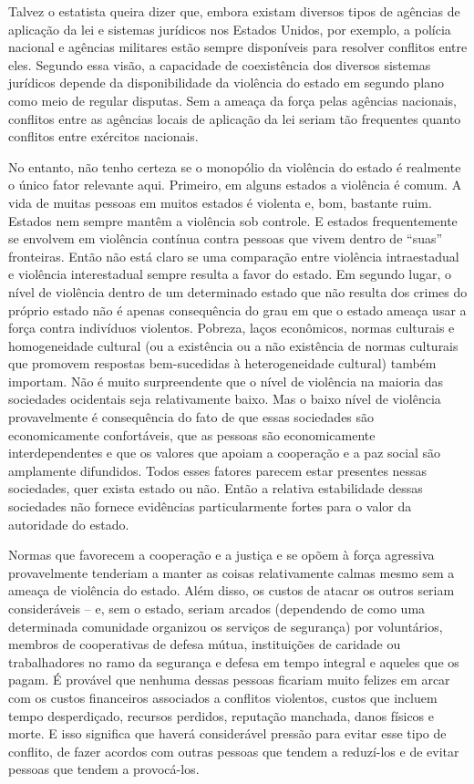 Talvez o estatista queira dizer que, embora existam diversos tipos de agências de aplicação da lei e sistemas jurídicos nos Estados Unidos, por exemplo, a polícia nacional e agências militares estão sempre disponíveis para resolver conflitos entre eles. Segundo essa visão, a capacidade de coexistência dos diversos sistemas jurídicos depende da disponibilidade da violência do estado em segundo plano como meio de regular disputas. Sem a ameaça da força pelas agências nacionais, conflitos entre as agências locais de aplicação da lei seriam tão frequentes quanto conflitos entre exércitos nacionais.

No entanto, não tenho certeza se o monopólio da violência do estado é realmente o único fator relevante aqui. Primeiro, em alguns estados a violência é comum. A vida de muitas pessoas em muitos estados é violenta e, bom, bastante ruim. Estados nem sempre mantêm a violência sob controle. E estados frequentemente se envolvem em violência contínua contra pessoas que vivem dentro de ``suas'' fronteiras. Então não está claro se uma comparação entre violência intraestadual e violência interestadual sempre resulta a favor do estado. Em segundo lugar, o nível de violência dentro de um determinado estado que não resulta dos crimes do próprio estado não é apenas consequência do grau em que o estado ameaça usar a força contra indivíduos violentos. Pobreza, laços econômicos, normas culturais e homogeneidade cultural (ou a existência ou a não existência de normas culturais que promovem respostas bem-sucedidas à heterogeneidade cultural) também importam. Não é muito surpreendente que o nível de violência na maioria das sociedades ocidentais seja relativamente baixo. Mas o baixo nível de violência provavelmente é consequência do fato de que essas sociedades são economicamente confortáveis, que as pessoas são economicamente interdependentes e que os valores que apoiam a cooperação e a paz social são amplamente difundidos. Todos esses fatores parecem estar presentes nessas sociedades, quer exista estado ou não. Então a relativa estabilidade dessas sociedades não fornece evidências particularmente fortes para o valor da autoridade do estado.

Normas que favorecem a cooperação e a justiça e se opõem à força agressiva provavelmente tenderiam a manter as coisas relativamente calmas mesmo sem a ameaça de violência do estado. Além disso, os custos de atacar os outros seriam consideráveis -- e, sem o estado, seriam arcados (dependendo de como uma determinada comunidade organizou os serviços de segurança) por voluntários, membros de cooperativas de defesa mútua, instituições de caridade ou trabalhadores no ramo da segurança e defesa em tempo integral e aqueles que os pagam. É provável que nenhuma dessas pessoas ficariam muito felizes em arcar com os custos financeiros associados a conflitos violentos, custos que incluem tempo desperdiçado, recursos perdidos, reputação manchada, danos físicos e morte. E isso significa que haverá considerável pressão para evitar esse tipo de conflito, de fazer acordos com outras pessoas que tendem a reduzí-los e de evitar pessoas que tendem a provocá-los.

